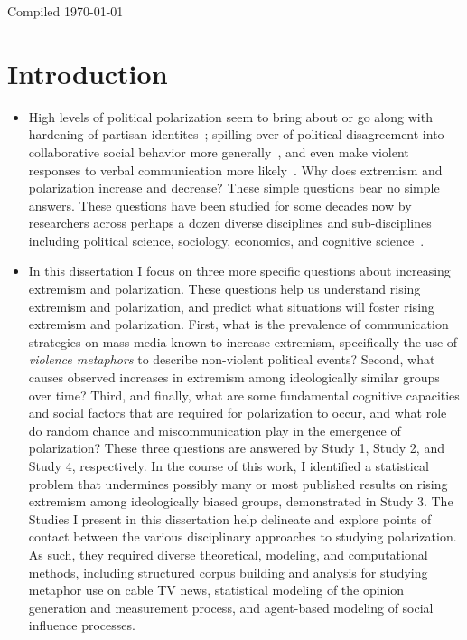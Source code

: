 \documentclass[12pt,letterpaper]{article}
\begin{document}
Compiled \today

\section{Introduction}

\begin{itemize}
  \item 
    High levels of political polarization seem to bring about or go along with
    hardening of partisan identites~\cite{Lee2015};
    spilling over of political disagreement into collaborative social behavior
    more generally~\cite{Iyengar2019}, and even make violent responses to verbal 
    communication more likely~\cite{Kalmoe2014,Kalmoe2018,Mason2018UncivilAgreementBook}.
    Why does extremism and polarization increase and decrease? These simple
    questions bear no simple answers. These questions
    have been studied for some decades now by researchers across perhaps a dozen
    diverse disciplines and sub-disciplines including political science, 
    sociology, economics, and cognitive science~\cite{Dixit2007,Rollwage2019}. 

  \item
    In this dissertation I focus
    on three more specific questions about increasing extremism and polarization.
    These questions help us understand rising extremism and polarization, and
    predict what situations will foster rising extremism and polarization.
    First, what is the prevalence of communication strategies on mass media
    known to increase extremism, specifically the use of \emph{violence metaphors}
    to describe non-violent political events? Second, what causes observed
    increases in extremism among ideologically similar groups over time?
    Third, and finally, what are some fundamental cognitive capacities and
    social factors that are required for polarization to occur, and what
    role do random chance and miscommunication play in the emergence of
    polarization? These three questions are answered by Study 1, Study 2, and
    Study 4, respectively. In the course of this work, I identified a statistical
    problem that undermines possibly many or most published results on rising
    extremism among ideologically biased groups, demonstrated in Study 3.
    The Studies I present in this dissertation help delineate and explore points of contact between
    the various disciplinary approaches to studying polarization. As such, they
    required diverse theoretical, modeling, and computational methods, 
    including structured corpus building and analysis for studying metaphor
    use on cable TV news, statistical modeling of the opinion generation and
    measurement process, and agent-based modeling of social influence processes.


\end{itemize}
\end{document}
